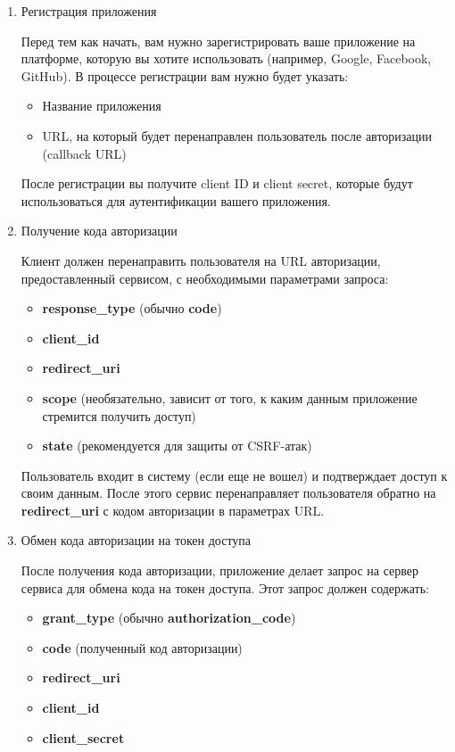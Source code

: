 \begin{enumerate}
	\item Регистрация приложения
	
	Перед тем как начать, вам нужно зарегистрировать ваше приложение на платформе, которую вы хотите использовать (например, Google, Facebook, GitHub). В процессе регистрации вам нужно будет указать:
	
	\begin{itemize}
		\item Название приложения
		\item URL, на который будет перенаправлен пользователь после авторизации (callback URL)
	\end{itemize}

	После регистрации вы получите client ID и client secret, которые будут использоваться для аутентификации вашего приложения.
	
	\item Получение кода авторизации
	
	Клиент должен перенаправить пользователя на URL авторизации, предоставленный сервисом, с необходимыми параметрами запроса:
	
	\begin{itemize}
		\item \textbf{response\_type} (обычно \textbf{code})
		\item \textbf{client\_id}
		\item \textbf{redirect\_uri}
		\item \textbf{scope} (необязательно, зависит от того, к каким данным приложение стремится получить доступ)
		\item \textbf{state} (рекомендуется для защиты от CSRF-атак)
	\end{itemize}
	
	Пользователь входит в систему (если еще не вошел) и подтверждает доступ к своим данным. После этого сервис перенаправляет пользователя обратно на \textbf{redirect\_uri} с кодом авторизации в параметрах URL.
	
	\item Обмен кода авторизации на токен доступа
	
	После получения кода авторизации, приложение делает запрос на сервер сервиса для обмена кода на токен доступа. Этот запрос должен содержать:
	
	\begin{itemize}
		\item \textbf{grant\_type} (обычно \textbf{authorization\_code})
		\item \textbf{code} (полученный код авторизации)
		\item \textbf{redirect\_uri}
		\item \textbf{client\_id}
		\item \textbf{client\_secret}
		

\end{itemize}
\end{enumerate}
